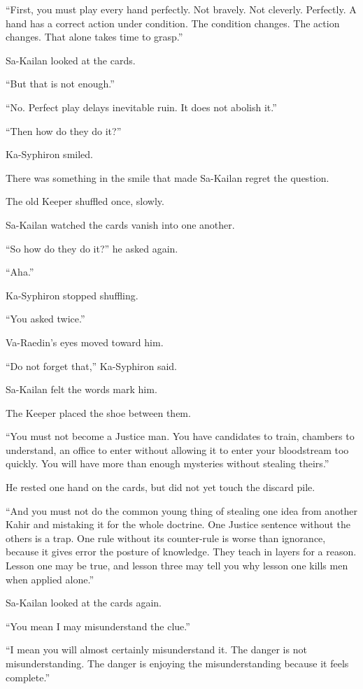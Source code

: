 “First, you must play every hand perfectly. Not bravely. Not cleverly. Perfectly. A hand has a correct action under condition. The condition changes. The action changes. That alone takes time to grasp.”\par
Sa-Kailan looked at the cards.\par
“But that is not enough.”\par
“No. Perfect play delays inevitable ruin. It does not abolish it.”\par
“Then how do they do it?”\par
Ka-Syphiron smiled.\par
There was something in the smile that made Sa-Kailan regret the question.\par
The old Keeper shuffled once, slowly.\par
Sa-Kailan watched the cards vanish into one another.\par
“So how do they do it?” he asked again.\par
“Aha.”\par
Ka-Syphiron stopped shuffling.\par
“You asked twice.”\par
Va-Raedin’s eyes moved toward him.\par
“Do not forget that,” Ka-Syphiron said.\par
Sa-Kailan felt the words mark him.\par
The Keeper placed the shoe between them.\par
“You must not become a Justice man. You have candidates to train, chambers to understand, an office to enter without allowing it to enter your bloodstream too quickly. You will have more than enough mysteries without stealing theirs.”\par
He rested one hand on the cards, but did not yet touch the discard pile.\par
“And you must not do the common young thing of stealing one idea from another Kahir and mistaking it for the whole doctrine. One Justice sentence without the others is a trap. One rule without its counter-rule is worse than ignorance, because it gives error the posture of knowledge. They teach in layers for a reason. Lesson one may be true, and lesson three may tell you why lesson one kills men when applied alone.”\par
Sa-Kailan looked at the cards again.\par
“You mean I may misunderstand the clue.”\par
“I mean you will almost certainly misunderstand it. The danger is not misunderstanding. The danger is enjoying the misunderstanding because it feels complete.”\par
